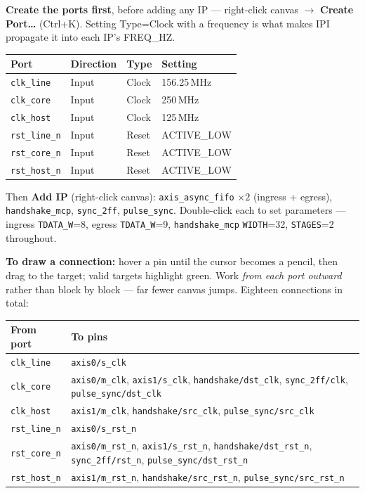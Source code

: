 \documentclass[10pt,a4paper]{article}
\newcommand{\code}[1]{\texttt{\small #1}}
\begin{document}
\textbf{Create the ports first}, before adding any IP --- right-click canvas $\to$
\textbf{Create Port\ldots} (Ctrl+K). Setting Type=Clock with a frequency is what
makes IPI propagate it into each IP's FREQ\_HZ.

\begin{center}
\small
\begin{tabular}{@{}llll@{}}
\toprule
\textbf{Port} & \textbf{Direction} & \textbf{Type} & \textbf{Setting} \\
\midrule
\code{clk\_line}  & Input & Clock & 156.25\,MHz \\
\code{clk\_core}  & Input & Clock & 250\,MHz \\
\code{clk\_host}  & Input & Clock & 125\,MHz \\
\code{rst\_line\_n} & Input & Reset & ACTIVE\_LOW \\
\code{rst\_core\_n} & Input & Reset & ACTIVE\_LOW \\
\code{rst\_host\_n} & Input & Reset & ACTIVE\_LOW \\
\bottomrule
\end{tabular}
\end{center}

Then \textbf{Add IP} (right-click canvas): \code{axis\_async\_fifo} $\times 2$
(ingress + egress), \code{handshake\_mcp}, \code{sync\_2ff}, \code{pulse\_sync}.
Double-click each to set parameters --- ingress \code{TDATA\_W}=8, egress
\code{TDATA\_W}=9, \code{handshake\_mcp} \code{WIDTH}=32, \code{STAGES}=2 throughout.

\textbf{To draw a connection:} hover a pin until the cursor becomes a pencil, then
drag to the target; valid targets highlight green. Work \emph{from each port
outward} rather than block by block --- far fewer canvas jumps. Eighteen
connections in total:

\begin{center}
\small
\begin{tabular}{@{}lp{10.2cm}@{}}
\toprule
\textbf{From port} & \textbf{To pins} \\
\midrule
\code{clk\_line}   & \code{axis0/s\_clk} \\
\code{clk\_core}   & \code{axis0/m\_clk}, \code{axis1/s\_clk},
                     \code{handshake/dst\_clk}, \code{sync\_2ff/clk},
                     \code{pulse\_sync/dst\_clk} \\
\code{clk\_host}   & \code{axis1/m\_clk}, \code{handshake/src\_clk},
                     \code{pulse\_sync/src\_clk} \\
\addlinespace
\code{rst\_line\_n} & \code{axis0/s\_rst\_n} \\
\code{rst\_core\_n} & \code{axis0/m\_rst\_n}, \code{axis1/s\_rst\_n},
                      \code{handshake/dst\_rst\_n}, \code{sync\_2ff/rst\_n},
                      \code{pulse\_sync/dst\_rst\_n} \\
\code{rst\_host\_n} & \code{axis1/m\_rst\_n}, \code{handshake/src\_rst\_n},
                      \code{pulse\_sync/src\_rst\_n} \\
\bottomrule
\end{tabular}
\end{center}
\end{document}
